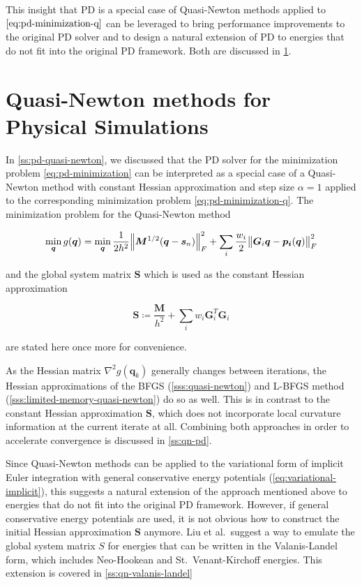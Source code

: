 This insight that PD is a special case of Quasi-Newton methods applied to $\cref{eq:pd-minimization-q}$ can be leveraged to
bring performance improvements to the original PD solver and to design a natural extension of PD to energies that do not fit 
into the original PD framework. Both are discussed in \cref{s:qn-rts}.

\section{Quasi-Newton methods for Physical Simulations}\label{s:qn-rts}
In \cref{ss:pd-quasi-newton}, we discussed that the PD solver for the minimization problem \cref{eq:pd-minimization}
can be interpreted as a special case of a Quasi-Newton method with constant Hessian approximation and step size $\alpha = 1$
applied to the corresponding minimization problem \cref{eq:pd-minimization-q}. The minimization problem for the Quasi-Newton
method

\begin{equation}\label{eq:pd-minimization-q2}
    \min_{\bm{q}} g(\bm{q}) = 
    \min_{\bm{q}} \frac{1}{2h^2} \norm{\bm{M}^{1/2}(\bm{q} - \bm{s}_n)}^2_F + \sum_i \frac{w_i}{2} \norm{\bm{G}_i\bm{q}
    - \bm{p_i}(\bm{q})}^2_F
\end{equation}

\noindent and the global system matrix $\bm{S}$ which is used as the constant Hessian approximation

\begin{equation}\label{eq:global-matrix}
    \bm{S} \coloneqq \frac{\bm{M}}{h^2} + \sum_i w_i \bm{G}_i^T \bm{G}_i  
\end{equation}

\noindent are stated here once more for convenience.

As the Hessian matrix $\nabla^2 g(\bm{q}_k)$ generally changes between iterations, the Hessian approximations of the 
BFGS (\cref{sss:quasi-newton}) and L-BFGS method (\cref{sss:limited-memory-quasi-newton}) do so as well.
This is in contrast to the constant Hessian approximation $\bm{S}$, which does not incorporate local curvature information
at the current iterate at all. Combining both approaches in order to accelerate convergence is discussed 
in \cref{ss:qn-pd}.

Since Quasi-Newton methods can be applied to the variational form of 
implicit Euler integration with general conservative energy potentials (\cref{eq:variational-implicit}), this suggests a 
natural extension of the approach mentioned above to energies that do not fit into the original PD framework. However,
if general conservative energy potentials are used, it is not obvious how to construct the initial Hessian approximation
$\bm{S}$ anymore. Liu et al.\ suggest a way to emulate the global system matrix $S$ for energies that can be written in
the Valanis-Landel form, which includes Neo-Hookean and St.\ Venant-Kirchoff energies. This extension is covered in 
\cref{ss:qn-valanis-landel}


